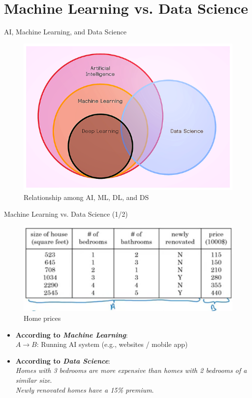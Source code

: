 \documentclass[pdf]{beamer}
\theoremstyle{mystyle}
\begin{document}
\section{Machine Learning vs. Data Science}
\begin{frame}{AI, Machine Learning, and Data Science}
	\begin{figure}[!ht]
		\centering
		\includegraphics[scale=.45]{diagram-venn-deep-learning}
		\caption{Relationship among AI, ML, DL, and DS~\citep{kharkovyna2019ABeginnersGuide}}
	\end{figure}
\end{frame}

\begin{frame}{Machine Learning vs. Data Science (1/2)}
	\begin{figure}[!ht]
		\centering
		\includegraphics[scale=.25]{ml-vs-ds}		
		\caption{Home prices~\citep{ng2019AIForEveryone}}
	\end{figure}
	\begin{itemize}
		\item<2-> \textbf{According to \textit{Machine Learning}}: \\
	$A \longrightarrow B$: Running AI system (e.g., websites / mobile app)
		\item<3-> 	\textbf{According to \textit{Data Science}}: \\
	\textit{Homes with 3 bedrooms are more expensive than homes with 2 bedrooms of a similar size}. \\		
	\textit{Newly renovated homes have a 15\% premium}.		
	\end{itemize}
\end{frame}
\end{document}

